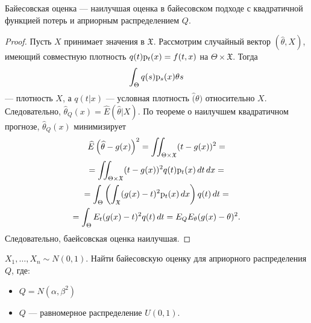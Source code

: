     \begin{theorem}
        Байесовская оценка --- наилучшая оценка в байесовском подходе с квадратичной функцией потерь и априорным распределением \(Q\).
    \end{theorem}
    \begin{proof}
        Пусть \(X\) принимает значения в \(\mathfrak{X}\). Рассмотрим случайный вектор \(\left(\widehat{\theta}, X\right)\), имеющий совместную плотность \(q(t) \mathrm{p}_{t}{\left(x\right)} = f(t, x)\) на \(\Theta \times \mathfrak{X}\). Тогда
        \begin{displaymath}
            \int_\Theta q(s) \mathrm{p}_{s}{\left(x\right)} \theta s
        \end{displaymath}
        --- плотность \(X\),
        а \(q(t | x)\) --- условная плотность \(\widehat(\theta)\) относительно \(X\). Следовательно, \(\hat{\theta}_Q (x) = \widehat{E} (\widehat{\theta} | X)\). По теореме о наилучшем квадратичном прогнозе, \(\hat{\theta}_Q(x)\) минимизирует
        \begin{multline*}
            \widehat{E} \left(\widehat{\theta} - g(x)\right)^2 = \iint_{\Theta \times \mathfrak{X}} (t - g(x))^2 = \\ =
            \iint_{\Theta \times \mathfrak{X}} (t - g(x))^2 q(t) \mathrm{p}_{t}{\left(x\right)} \mathop{}\!d t \mathop{}\!d x = \\ =
            \int_\Theta \left(\int_\mathfrak{X} (g(x) - t)^2 \mathrm{p}_{t}{\left(x\right)} \mathop{}\!d x\right) q(t) \mathop{}\!d t = \\ =
            \int_\Theta E_t (g(x) - t)^2 q(t) \mathop{}\!d t = E_Q E_\theta (g(x) - \theta)^2.
        \end{multline*}
        Следовательно, баейсовская оценка наилучшая.
    \end{proof}

    \begin{example}
        \(X_1, \ldots, X_n \sim N(0, 1)\). Найти байесовскую оценку для априорного распределения \(Q\), где:
        \begin{itemize}
            \item \(Q = N(\alpha, \beta^2)\)
            \item \(Q\) --- равномерное распределение \(U(0, 1)\).
        \end{itemize}
    \end{example}

